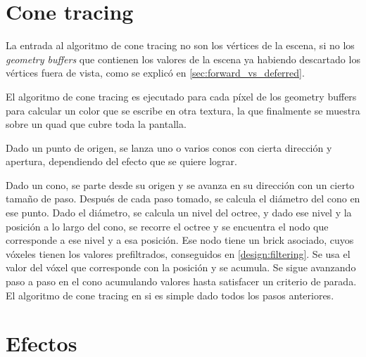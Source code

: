 \section{Cone tracing}\label{sec:cone_tracing}


La entrada al algoritmo de cone tracing no son los vértices de la escena, si no los \textit{geometry buffers} que contienen los valores de la escena ya habiendo descartado los vértices fuera de vista, como se explicó en \ref{sec:forward_vs_deferred}.

El algoritmo de cone tracing es ejecutado para cada píxel de los geometry buffers para calcular un color que se escribe en otra textura, la que finalmente se muestra sobre un quad que cubre toda la pantalla.

Dado un punto de origen, se lanza uno o varios conos con cierta dirección y apertura, dependiendo del efecto que se quiere lograr.

Dado un cono, se parte desde su origen y se avanza en su dirección con un cierto tamaño de paso.
Después de cada paso tomado, se calcula el diámetro del cono en ese punto.
Dado el diámetro, se calcula un nivel del octree, y dado ese nivel y la posición a lo largo del cono, se recorre el octree y se encuentra el nodo que corresponde a ese nivel y a esa posición.
Ese nodo tiene un brick asociado, cuyos vóxeles tienen los valores prefiltrados, conseguidos en \ref{design:filtering}.
Se usa el valor del vóxel que corresponde con la posición y se acumula.
Se sigue avanzando paso a paso en el cono acumulando valores hasta satisfacer un criterio de parada.
El algoritmo de cone tracing en si es simple dado todos los pasos anteriores.

\section{Efectos}

